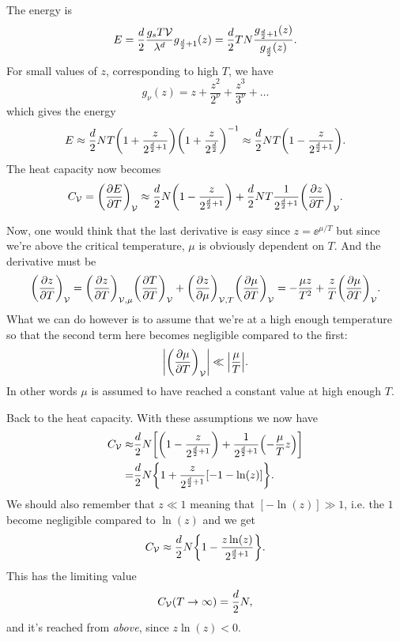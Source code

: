 \documentclass[11pt,letter, swedish, english
]{article}
\begin{document}
The energy is 
\begin{equation}\label{eq:4e_E}
E=\frac{d}{2}\frac{g_sT\mathcal{V}}{\lambda^d}g_{\frac{d}{2}+1}(z)
=\frac{d}{2}TN\frac{g_{\frac{d}{2}+1}(z)}{g_{\frac{d}{2}}(z)}.
\end{equation}
For small values of $z$, corresponding to high
$T$, we have
\begin{equation}
g_\nu(z)=z+\frac{z^2}{2^\nu}+\frac{z^3}{3^\nu}+\ldots
\end{equation}
which gives the energy
\begin{equation}
E\approx \frac{d}{2}NT
\qty(1+\frac{z}{2^{\frac{d}{2}+1}})\qty(1+\frac{z}{2^{\frac{d}{2}}})^{-1}
\approx\frac{d}{2}NT \qty(1-\frac{z}{2^{\frac{d}{2}+1}}).
\end{equation}
The heat capacity now becomes
\begin{equation}
C_{\mathcal{V}}=\qty(\pdv{E}{T})_{\mathcal{V}}\approx
\frac{d}{2}N \qty(1-\frac{z}{2^{\frac{d}{2}+1}})
+\frac{d}{2}NT \frac{1}{2^{\frac{d}{2}+1}}\qty(\pdv{z}{T})_{\mathcal{V}}.
\end{equation}

Now, one would think that the last derivative is easy since
$z=\ee^{\mu/T}$ but since we're above the critical temperature, $\mu$
is obviously dependent on $T$. And the derivative must be
\begin{equation}
\qty(\pdv{z}{T})_{\mathcal{V}}
=\qty(\pdv{z}{T})_{\mathcal{V},\mu}\qty(\pdv{T}{T})_{\mathcal{V}}
+\qty(\pdv{z}{\mu})_{\mathcal{V},T}\qty(\pdv{\mu}{T})_{\mathcal{V}}
=-\frac{\mu z}{T^2} + \frac{z}{T}\qty(\pdv{\mu}{T})_{\mathcal{V}}.
\end{equation}
What we can do however is to assume that we're at a high enough
temperature so that the second term here becomes negligible compared
to the first:
\begin{equation}
\abs{\qty(\pdv{\mu}{T})_{\mathcal{V}}}\ll\abs{\frac{\mu}{T}}.
\end{equation}
In other words $\mu$ is assumed to have reached a constant value at
high enough $T$.

Back to the heat capacity. With these assumptions we now have
\begin{equation}
\begin{aligned}
C_{\mathcal{V}}\approx&
\frac{d}{2}N\qty[ \qty(1-\frac{z}{2^{\frac{d}{2}+1}})
+\frac{1}{2^{\frac{d}{2}+1}}\qty(-\frac{\mu}{T}z)]\\
=& \frac{d}{2}N\qty{1+\frac{z}{2^{\ensuremath{\frac{d}{2}}+1}}\qty[-1-\ln(z)]}.
\end{aligned}
\end{equation}
We should also remember that $z\ll1$ meaning that $[-\ln(z)]\gg1$,
i.e. the $1$ become negligible compared to $\ln(z)$ and we get
\begin{equation}
C_{\mathcal{V}}\approx
\frac{d}{2}N\qty{1-\frac{z\ln(z)}{2^{\ensuremath{\frac{d}{2}}+1}}}.
\end{equation}
This has the limiting value
\begin{equation}
C_{\mathcal{V}}(T\to\infty)=\frac{d}{2}N,
\end{equation}
and it's reached from \emph{above}, since $z\ln(z)<0$.
\end{document}
